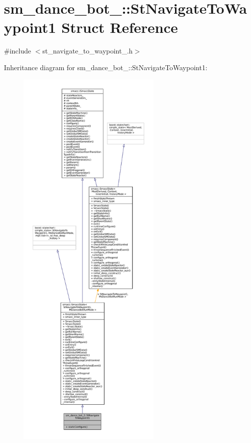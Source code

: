 \hypertarget{structsm__dance__bot__2_1_1StNavigateToWaypoint1}{}\section{sm\+\_\+dance\+\_\+bot\+\_\+:\+:St\+Navigate\+To\+Waypoint1 Struct Reference}
\label{structsm__dance__bot__2_1_1StNavigateToWaypoint1}


{\ttfamily \#include $<$st\+\_\+navigate\+\_\+to\+\_\+waypoint\+\_.\+h$>$}



Inheritance diagram for sm\+\_\+dance\+\_\+bot\+\_\+:\+:St\+Navigate\+To\+Waypoint1\+:
\nopagebreak
\begin{figure}[H]
\begin{center}
\leavevmode
\includegraphics[height=550pt]{structsm__dance__bot__2_1_1StNavigateToWaypoint1__inherit__graph}
\end{center}
\end{figure}


